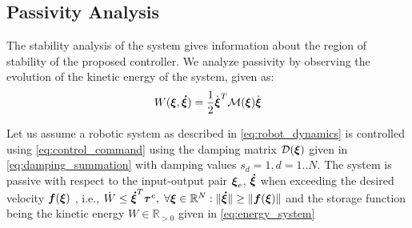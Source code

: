 \subsection{Passivity Analysis}
The stability analysis of the system gives information about the region of stability of the proposed controller. We analyze passivity by observing the evolution of the kinetic energy of the system, given as:
\begin{equation}
	W(\vecs \xi, \vecs{\dot \xi}) = \frac{1}{2}  \dot{\vecs{\xi}}^T \matd{M}(\vecs \xi) \dot{\vecs{\xi}} \label{eq:energy_system}
\end{equation}

\begin{lemma} \label{lemma:passivity}
   Let us assume a robotic system as described in \eqref{eq:robot_dynamics} is controlled using \eqref{eq:control_command} using the damping matrix $\mathcal{D}(\boldsymbol{\xi})$ given in \eqref{eq:damping_summation} with damping values $s_d = 1, d = 1 .. N$.
   The system is passive with respect to the input-output pair $\boldsymbol{\xi}_e$, $\boldsymbol{\dot \xi}$ when exceeding the desired velocity $\boldsymbol{f}(\boldsymbol{\xi})$ , i.e., $\dot{W} \leq \boldsymbol{\dot \xi}^T \boldsymbol{\tau}^e, \; \forall \boldsymbol{\xi} \in \mathbb{R}^N: \| \boldsymbol{\dot \xi} \| \geq \| \boldsymbol{f}(\boldsymbol{\xi}) \|$ and the storage function being the kinetic energy $W \in \mathbb{R}_{>0}$ given in \eqref{eq:energy_system}
\end{lemma}

